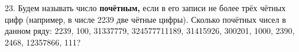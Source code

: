 23. Будем называть число {\bf почётным,} если в его записи не более трёх чётных цифр (например, в числе 2239 две чётные цифры). Сколько почётных чисел в данном ряду: 2239, 100, 31337779, 324577711189, 31415926, 300201, 1000, 2390, 2468, 12357866, 111?\\

